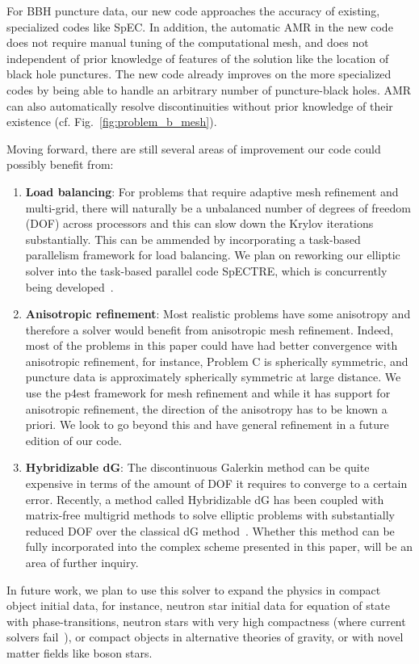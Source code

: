For BBH puncture data, our new code approaches the accuracy of
  existing, specialized codes like SpEC.  In addition, the automatic
  AMR in the new code does not require manual tuning of the
  computational mesh, and does not independent of prior knowledge of
  features of the solution like the location of black hole punctures.
  The new code already improves on the more specialized codes by being
  able to handle an arbitrary number of puncture-black holes.  AMR can
  also automatically resolve discontinuities without prior knowledge
  of their existence (cf. Fig.~\ref{fig:problem_b_mesh}).

  Moving forward, there are
still several areas of improvement our code could possibly benefit
from:

\begin{enumerate}
\item {\bf Load balancing}: For problems that require adaptive mesh
  refinement and multi-grid, there will naturally be a unbalanced
  number of degrees of freedom (DOF) across processors and this can
  slow down the Krylov iterations substantially. This can be ammended
  by incorporating a task-based parallelism framework for load
  balancing.  We plan on reworking our elliptic solver into the
  task-based parallel code SpECTRE, which is concurrently being developed~\cite{kidder:16}.
\item {\bf Anisotropic refinement}: Most realistic problems have some
  anisotropy and therefore a solver would benefit from anisotropic
  mesh refinement.  Indeed, most of the problems in this paper could
  have had better convergence with anisotropic refinement, for instance, Problem C is spherically symmetric, and puncture data is approximately spherically symmetric at large distance.  We use the
  p4est framework for mesh refinement and while it has support for
  anisotropic refinement, the direction of the anisotropy has to be
  known a priori. We look to go beyond this and have general
  refinement in a future edition of our code.
\item {\bf Hybridizable dG}: The discontinuous Galerkin method can be quite
  expensive in terms of the amount of DOF it requires to converge to a
  certain error. Recently, a method called Hybridizable dG has been
  coupled with matrix-free multigrid methods to solve elliptic
  problems with substantially reduced DOF over the classical dG
  method~\cite{fabien2019manycore,muralikrishnan2019multilevel}. Whether
  this method can be fully incorporated into the complex scheme
  presented in this paper, will be an area of further inquiry.
\end{enumerate}

In future work, we plan to use this solver to expand the physics in
compact object initial data, for instance, neutron star initial data
for equation of state with phase-transitions, neutron stars with
very high compactness (where current solvers fail~\cite{henriksson:2014tba}),
or compact objects in alternative theories of gravity, or with novel matter fields like boson stars.


